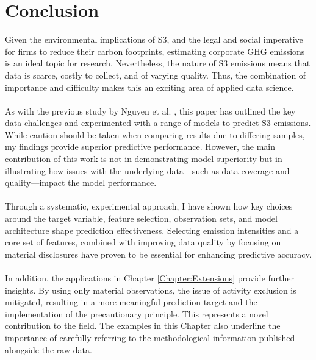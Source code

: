 \documentclass[12pt,twoside]{report}
\begin{document}
\chapter{Conclusion}\label{Chapter:Conclusion}

Given the environmental implications of S3, and the legal and social imperative for firms to reduce their carbon footprints, estimating corporate GHG emissions is an ideal topic for research. Nevertheless, the nature of S3 emissions means that data is scarce, costly to collect, and of varying quality. Thus, the combination of importance and difficulty makes this an exciting area of applied data science.
\\\\
As with the previous study by Nguyen et al. \cite{Nguyenetal2023}, this paper has outlined the key data challenges and experimented with a range of models to predict S3 emissions. While caution should be taken when comparing results due to differing samples, my findings provide superior predictive performance. However, the main contribution of this work is not in demonstrating model superiority but in illustrating how issues with the underlying data—such as data coverage and quality—impact the model performance.
\\\\
Through a systematic, experimental approach, I have shown how key choices around the target variable, feature selection, observation sets, and model architecture shape prediction effectiveness. Selecting emission intensities and a core set of features, combined with improving data quality by focusing on material disclosures have proven to be essential for enhancing predictive accuracy. 
\\\\
In addition, the applications in Chapter \ref{Chapter:Extensions} provide further insights. By using only material observations, the issue of activity exclusion is mitigated, resulting in a more meaningful prediction target and the implementation of the precautionary principle. This represents a novel contribution to the field. The examples in this Chapter also underline the importance of carefully referring to the methodological information published alongside the raw data.
\\\\
\end{document}
